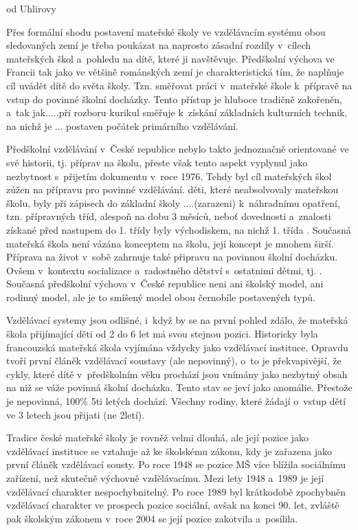 od Uhlirovy

Přes formální shodu postavení mateřské školy ve vzdělávacím systému obou sledovaných zemí je třeba poukázat na naprosto zásadní rozdíly v~cílech mateřských škol a~pohledu na dítě, které ji navštěvuje.
Předškolní výchova ve Francii tak jako ve většině románských zemí je charakteristická tím, že naplňuje cíl uvádět dítě do světa školy. Tzn. směřovat práci v~mateřské škole k~přípravě na vstup do povinné školní docházky. Tento přístup je hluboce tradičně zakořeněn, a~tak jak.....při rozboru kurikul směřuje k~získání základních kulturních technik, na nichž je ... postaven počátek primárního vzdělávání. 

Předškolní vzdělávání v~České republice nebylo takto jednoznačně orientované ve své historii, tj. příprav na školu, přeste však tento aspekt vyplynul jako nezbytnost s~přijetím dokumentu  v~roce 1976. Tehdy byl cíl mateřských škol zúžen na přípravu pro povinné vzdělávání. děti, které neabsolvovaly mateřskou školu, byly při zápisech do základní školy ....(zarazeni) k~náhradnímu opatření, tzn. přípravných tříd, alespoň na dobu 3 měsíců, neboť dovednosti a~znalosti získané před nastupem do 1. třídy byly východiskem, na nichž 1. třída . Současná mateřská škola není vázána konceptem na školu, její koncept je mnohem širší. Příprava na život v~sobě zahrnuje také připravu na povinnou školní docházku. Ovšem v~kontextu socializace a~radostného dětství s~ostatnimi dětmi, tj. . Současná předškolní výchova v~České republice neni ani školský model, ani rodinný model, ale je to smíšený model obou černobíle postavených typů.

Vzdělávací systemy jsou odlišné, i~když by se na první pohled zdálo, že mateřská škola přijímající děti od 2 do 6 let má svou stejnou pozici. Historicky byla francouzská mateřská škola vyjímána vždycky jako vzdělávací instituce. Opravdu tvoří první článěk vzdělávací soustavy (ale nepovinný), o~to je překvapivější, že cykly, které dítě v~předškolním věku prochází jsou vnímány jako nezbytný obsah na niž se váže povinná školní docházka. Tento stav se jeví jako anomálie. Přestože je nepovinná, 100\% 5ti letých dochází. Všechny rodiny, které žádají o~vstup dětí ve 3 letech jsou přijati (ne 2letí).

Tradice české mateřské školy je rovněž velmi dlouhá, ale její pozice jako vzdělávací instituce se vztahuje až ke školskému zákonu, kdy je zařazena jako první článěk vzdělávací sousty. Po roce 1948 se pozice MŠ více blížila sociálnímu zařízení, než skutečně výchovně vzdělávacímu. Mezi lety 1948 a~1989 je její vzdělávací charakter nespochybnitelný. Po roce 1989 byl krátkodobě zpochybněn vzdělávací charakter ve prospech pozice sociální, avšak na konci 90. let, zvláště pak školským zákonem v~roce 2004 se její pozice zakotvila a~posílila. 